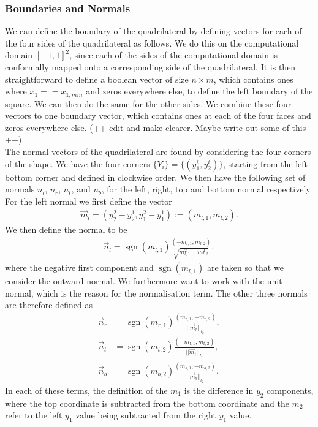 \documentclass[11pt, a4paper]{article}
\theoremstyle{definition}
\DeclareMathOperator{\sgn}{sgn}
\begin{document}
\subsubsection{Boundaries and Normals}
We can define the boundary of the quadrilateral by defining vectors for each of the four sides of the quadrilateral as follows. We do this on the computational domain $[-1,1]^2$, since each of the sides of the computational domain is conformally mapped onto a corresponding side of the quadrilateral. It is then straightforward to define a boolean vector of size $n \times m$, which contains ones where $x_1 == x_{1,min}$ and zeros everywhere else, to define the left boundary of the square. We can then do the same for the other sides. We combine these four vectors to one boundary vector, which contains ones at each of the four faces and zeros everywhere else. (++ edit and make clearer. Maybe write out some of this ++)
\\
The normal vectors of the quadrilateral are found by considering the four corners of the shape. We have the four corners $\{Y_i\} = \{(y_1^i,y_2^i)\}$, starting from the left bottom corner and defined in clockwise order. We then have the following set of normals $n_l$, $n_r$, $n_t$, and $n_b$, for the left, right, top and bottom normal respectively.
For the left normal we first define the vector
\begin{align*}
     \vec m_l = \left(y_2^2 - y_2^1, y_1^2 - y_1^1 \right) := \left(m_{l,1},m_{l,2} \right). 
\end{align*}
We then define the normal to be
\begin{align*}
	\vec n_l =  \sgn (m_{l,1})\frac{\left(-m_{l,1},m_{l,2} \right)}{\sqrt{m_{l,1}^2+m_{l,2}^2 }},
\end{align*}
where the negative first component and $\sgn (m_{l,1})$ are taken so that we 
consider the outward normal. We furthermore want to work with the unit normal, which is the reason for the normalisation term. The other three normals are therefore defined as
\begin{align*}
	\vec n_r &=  \sgn (m_{r,1})\frac{\left(m_{r,1}, - m_{r,2} \right)}{||\vec m_{r} ||_{l_2}},\\
	\vec n_t &=  \sgn (m_{t,2})\frac{\left(-m_{t,1},m_{t,2} \right)}{||\vec m_{t} ||_{l_2}},\\
	\vec n_b &=  \sgn (m_{b,2})\frac{\left(m_{b,1},-m_{b,2} \right)}{||\vec m_{b} ||_{l_2}}.
\end{align*}
In each of these terms, the definition of the $m_1$ is the difference in $y_2$ components, where the top coordinate is subtracted from the bottom coordinate and the $m_2$ refer to the left $y_1$ value being subtracted from the right $y_1$ value.
\end{document}

